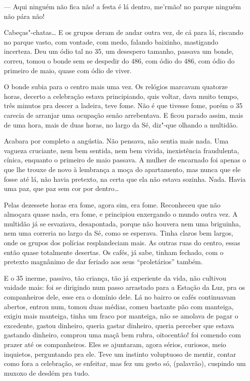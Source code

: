 --- Aqui ninguém não fica não! a festa é lá dentro, me'rmão! no parque
ninguém não pára não!

Cabeças"-chatas\ldots{} E os grupos deram de andar outra vez, de cá para lá,
riscando no parque vasto, com vontade, com medo, falando baixinho,
mastigando incerteza. Deu um ódio tal no 35, um desespero tamanho,
passava um bonde, correu, tomou o bonde sem se despedir do 486, com ódio
do 486, com ódio do primeiro de maio, quase com ódio de viver.

O bonde subia para o centro mais uma vez. Os relógios marcavam quatorze
horas, decerto a celebração estava principiando, quis voltar, dava muito
tempo, três minutos pra descer a ladeira, teve fome. Não é que tivesse
fome, porém o 35 carecia de arranjar uma ocupação senão arrebentava. E
ficou parado assim, mais de uma hora, mais de duas horas, no largo da
Sé, diz"-que olhando a multidão.

Acabara por completo a angústia. Não pensava, não sentia mais nada. Uma
vagueza cruciante, nem bem sentida, nem bem vivida, inexistência
fraudulenta, cínica, enquanto o primeiro de maio passava. A mulher de
encarnado foi apenas o que lhe trouxe de novo à lembrança a moça do
apartamento, mas nunca que ele fosse até lá, não havia pretexto, na
certa que ela não estava sozinha. Nada. Havia uma paz, que paz sem cor
por dentro\ldots{}

Pelas dezessete horas era fome, agora sim, era fome. Reconheceu que não
almoçara quase nada, era fome, e principiou enxergando o mundo outra
vez. A multidão já se esvaziava, desapontada, porque não houvera nem uma
briguinha, nem uma correria no largo da Sé, como se esperava. Tinha
claros bem largos, onde os grupos dos polícias resplandeciam mais. As
outras ruas do centro, essas então quase totalmente desertas. Os cafés,
já sabe, tinham fechado, com o pretexto magnânimo de dar feriado aos
seus ``proletários'' também.

E o 35 inerme, passivo, tão criança, tão já experiente da vida, não
cultivou vaidade mais: foi se dirigindo num passo arrastado para a
Estação da Luz, pra os companheiros dele, esse era o domínio dele. Lá no
bairro os cafés continuavam abertos, entrou num, tomou duas médias,
comeu bastante pão com manteiga, exigiu mais manteiga, tinha um fraco
por manteiga, não se amolava de pagar o excedente, gastou dinheiro,
queria gastar dinheiro, queria perceber que estava gastando dinheiro,
comprou uma maçã bem rubra, oitocentão! foi comendo com prazer até os
companheiros. Eles se ajuntaram, agora sérios, curiosos, meio inquietos,
perguntando pra ele. Teve um instinto voluptuoso de mentir, contar como
fora a celebração, se enfeitar, mas fez um gesto só, (palavrão),
cuspindo um muxoxo de desdém pra tudo.


